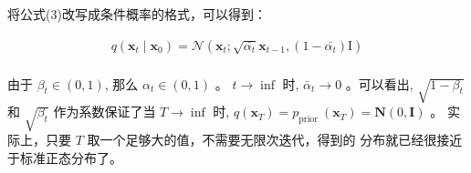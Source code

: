 \documentclass[]{ctexart}
\begin{document}
将公式(3)改写成条件概率的格式，可以得到：

$$
\begin{gathered}
q\left(\mathbf{x}_t \mid \mathbf{x}_{0}\right)=\mathcal{N}\left(\mathbf{x}_t ; \sqrt{\bar{\alpha_t}} \mathbf{x}_{t-1}, (1-\bar{\alpha_t}) \mathrm{I}\right) \\
\end{gathered}
$$

由于 $\beta_t \in(0,1)$, 那么 $\alpha_t \in(0,1)$ 。 $t \rightarrow \inf$ 时, $\bar{\alpha}_t \rightarrow 0$ 。可以看出, $\sqrt{1-\beta_t}$ 和 $\sqrt{\beta_t}$ 
作为系数保证了当 $T \rightarrow \inf$ 时, $q\left(\mathbf{x}_T\right)=p_{\text {prior }}\left(\mathbf{x}_T\right)=\mathbf{N}(0, \mathbf{I})$ 。
实际上，只要 $T$ 取一个足够大的值，不需要无限次迭代，得到的 分布就已经很接近于标准正态分布了。
\end{document}
